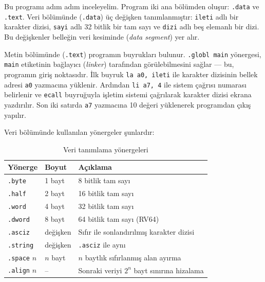Bu programı adım adım inceleyelim. Program iki ana bölümden oluşur: \texttt{.data} ve \texttt{.text}. Veri bölümünde (\texttt{.data}) üç değişken tanımlanmıştır: \texttt{ileti} adlı bir karakter dizisi, \texttt{sayi} adlı 32 bitlik bir tam sayı ve \texttt{dizi} adlı beş elemanlı bir dizi. Bu değişkenler belleğin veri kesiminde (\emph{data segment}) yer alır.

Metin bölümünde (\texttt{.text}) programın buyrukları bulunur. \texttt{.globl main} yönergesi, \texttt{main} etiketinin bağlayıcı (\emph{linker}) tarafından görülebilmesini sağlar --- bu, programın giriş noktasıdır. İlk buyruk \texttt{la a0, ileti} ile karakter dizisinin bellek adresi \texttt{a0} yazmacına yüklenir. Ardından \texttt{li a7, 4} ile sistem çağrısı numarası belirlenir ve \texttt{ecall} buyruğuyla işletim sistemi çağrılarak karakter dizisi ekrana yazdırılır. Son iki satırda \texttt{a7} yazmacına 10 değeri yüklenerek programdan çıkış yapılır.

Veri bölümünde kullanılan yönergeler şunlardır:

\begin{table}[H]
\centering
\caption{Veri tanımlama yönergeleri}
\label{tab:veri-yonergeleri}
\small
\begin{tabularx}{\textwidth}{l l X}
\toprule
\textbf{Yönerge} & \textbf{Boyut} & \textbf{Açıklama} \\
\midrule
\texttt{.byte} & 1 bayt & 8 bitlik tam sayı \\
\texttt{.half} & 2 bayt & 16 bitlik tam sayı \\
\texttt{.word} & 4 bayt & 32 bitlik tam sayı \\
\texttt{.dword} & 8 bayt & 64 bitlik tam sayı (RV64) \\
\texttt{.asciz} & değişken & Sıfır ile sonlandırılmış karakter dizisi \\
\texttt{.string} & değişken & \texttt{.asciz} ile aynı \\
\texttt{.space} $n$ & $n$ bayt & $n$ baytlık sıfırlanmış alan ayırma \\
\texttt{.align} $n$ & -- & Sonraki veriyi $2^n$ bayt sınırına hizalama \\
\bottomrule
\end{tabularx}
\end{table}

